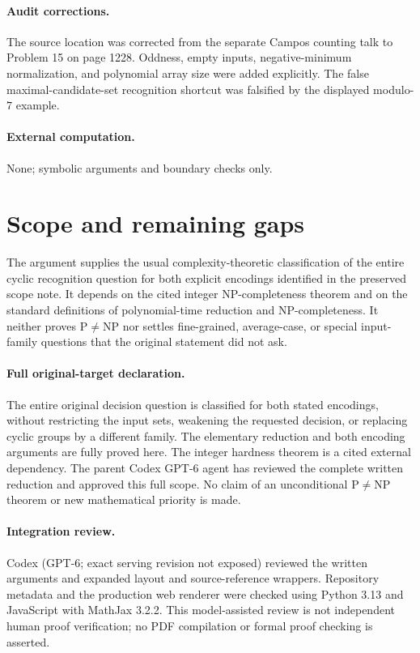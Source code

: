 \documentclass[11pt]{article}
\begin{document}
\paragraph{Audit corrections.} The source location was corrected from the separate Campos counting talk to
Problem 15 on page 1228. Oddness, empty inputs, negative-minimum normalization,
and polynomial array size were added explicitly. The false maximal-candidate-set
recognition shortcut was falsified by the displayed modulo-$7$ example.
\paragraph{External computation.} None; symbolic arguments and boundary checks only.
\section{Scope and remaining gaps}

The argument supplies the usual complexity-theoretic classification of the entire
cyclic recognition question for both explicit encodings identified in the preserved
scope note. It depends on the cited integer NP-completeness theorem and on the
standard definitions of polynomial-time reduction and NP-completeness. It neither
proves $\mathrm P\ne\mathrm{NP}$ nor settles fine-grained, average-case, or special
input-family questions that the original statement did not ask.
\paragraph{Full original-target declaration.}
The entire original decision question is classified for both stated encodings,
without restricting the input sets, weakening the requested decision, or replacing
cyclic groups by a different family. The elementary reduction and both encoding
arguments are fully proved here. The integer hardness theorem is a cited external
dependency. The parent Codex GPT-6 agent has reviewed the complete written
reduction and approved this full scope. No claim of an unconditional
$\mathrm P\ne\mathrm{NP}$ theorem or new mathematical priority is made.

\paragraph{Integration review.} Codex (GPT-6; exact serving revision not exposed) reviewed the written arguments and expanded layout and source-reference wrappers. Repository metadata and the production web renderer were checked using Python 3.13 and JavaScript with MathJax 3.2.2. This model-assisted review is not independent human proof verification; no PDF compilation or formal proof checking is asserted.
\end{document}
